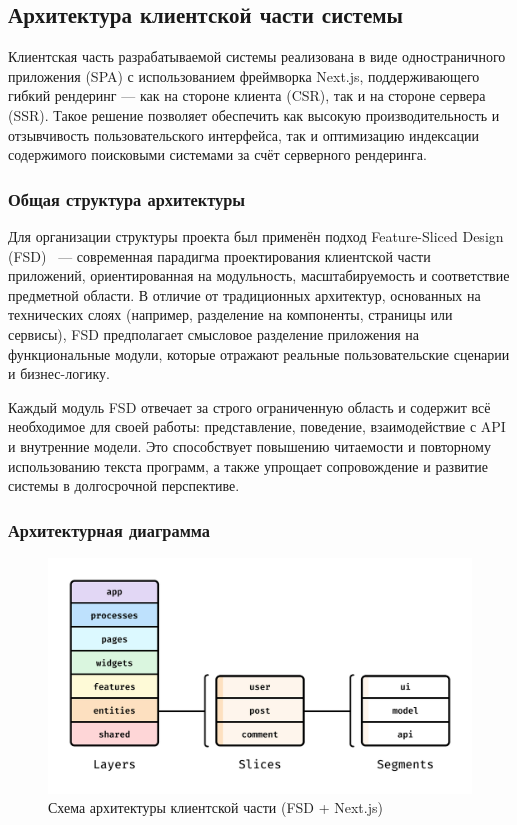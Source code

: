 \subsection{Архитектура клиентской части системы}

Клиентская часть разрабатываемой системы реализована в виде одностраничного приложения (SPA) с использованием фреймворка Next.js, поддерживающего гибкий рендеринг — как на стороне клиента (CSR), так и на стороне сервера (SSR). Такое решение позволяет обеспечить как высокую производительность и отзывчивость пользовательского интерфейса, так и оптимизацию индексации содержимого поисковыми системами за счёт серверного рендеринга.

\subsubsection{Общая структура архитектуры}

Для организации структуры проекта был применён подход Feature-Sliced Design (FSD)~\cite{feature_sliced_design} — современная парадигма проектирования клиентской части приложений, ориентированная на модульность, масштабируемость и соответствие предметной области. В отличие от традиционных архитектур, основанных на технических слоях (например, разделение на компоненты, страницы или сервисы), FSD предполагает смысловое разделение приложения на функциональные модули, которые отражают реальные пользовательские сценарии и бизнес-логику.

Каждый модуль FSD отвечает за строго ограниченную область и содержит всё необходимое для своей работы: представление, поведение, взаимодействие с API и внутренние модели. Это способствует повышению читаемости и повторному использованию текста программ, а также упрощает сопровождение и развитие системы в долгосрочной перспективе.

\subsubsection{Архитектурная диаграмма}

\begin{figure}[h]
  \centering
  \includegraphics[width=0.7\linewidth]{static/fsdImage}
  \caption{Схема архитектуры клиентской части (FSD + Next.js)}
\end{figure}

